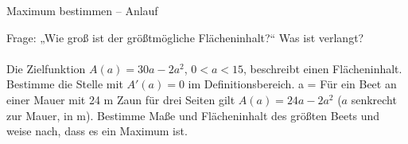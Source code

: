 \setcounter{aufgabe}{0}

\begin{aufgabe}{Maximum bestimmen – Anlauf}
\begin{teile}
\teil Frage: „Wie groß ist der größtmögliche Flächeninhalt?“ Was ist verlangt?  \\  \\ 
\teil Die Zielfunktion $A(a) = 30a - 2a^2$, $0 < a < 15$, beschreibt einen Flächeninhalt. Bestimme die Stelle mit $A'(a) = 0$ im Definitionsbereich. a = \leerfeld
\teil Für ein Beet an einer Mauer mit 24 m Zaun für drei Seiten gilt $A(a) = 24a - 2a^2$ ($a$ senkrecht zur Mauer, in m). Bestimme Maße und Flächeninhalt des größten Beets und weise nach, dass es ein Maximum ist.
\end{teile}
\end{aufgabe}

